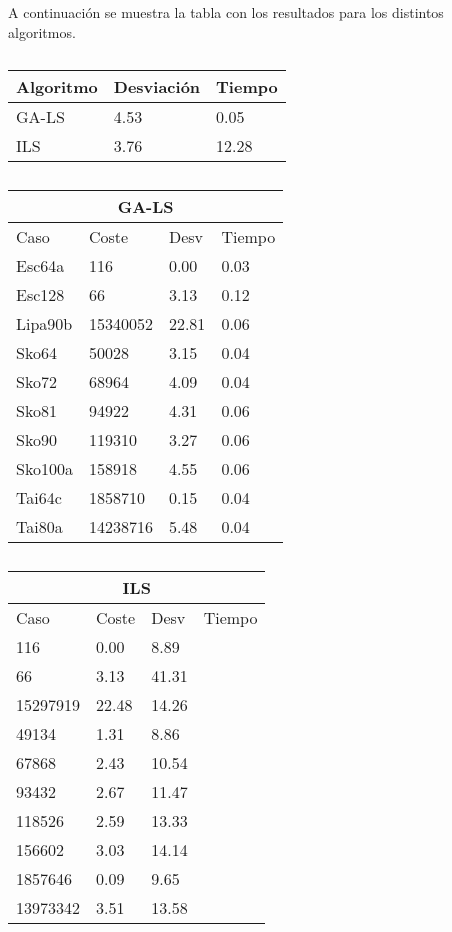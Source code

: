 \documentclass[twoside]{article}
\begin{document}
A continuación se muestra la tabla con los resultados para los distintos algoritmos.

\begin{table}[h]
\centering
    \begin{tabular}{lll}
    \toprule
    Algoritmo               & Desviación & Tiempo \\
    \midrule
GA-LS&4.53&0.05\\
ILS&3.76&12.28\\
    \bottomrule
    \end{tabular}
    \caption{}
\end{table}


\begin{table}[h]
\centering
    \begin{tabular}{llll}
    \hline
    \multicolumn{4}{c}{GA-LS} \\
    \toprule
    Caso               & Coste & Desv & Tiempo \\
    \midrule
Esc64a&116&0.00&0.03\\
Esc128&66&3.13&0.12\\
Lipa90b&15340052&22.81&0.06\\
Sko64&50028&3.15&0.04\\
Sko72&68964&4.09&0.04\\
Sko81&94922&4.31&0.06\\
Sko90 &119310&3.27&0.06\\
Sko100a&158918&4.55&0.06\\
Tai64c&1858710&0.15&0.04\\
Tai80a&14238716&5.48&0.04\\
    \bottomrule
    \end{tabular}
    \caption{}
\end{table}


\begin{table}[h]
\centering
    \begin{tabular}{llll}
    \hline
    \multicolumn{4}{c}{ILS} \\
    \toprule
    Caso               & Coste & Desv & Tiempo \\
    \midrule
116&0.00&8.89\\
66&3.13&41.31\\
15297919&22.48&14.26\\
49134&1.31&8.86\\
67868&2.43&10.54\\
93432&2.67&11.47\\
118526&2.59&13.33\\
156602&3.03&14.14\\
1857646&0.09&9.65\\
13973342&3.51&13.58\\

    \bottomrule
    \end{tabular}
    \caption{}
\end{table}
\end{document}
